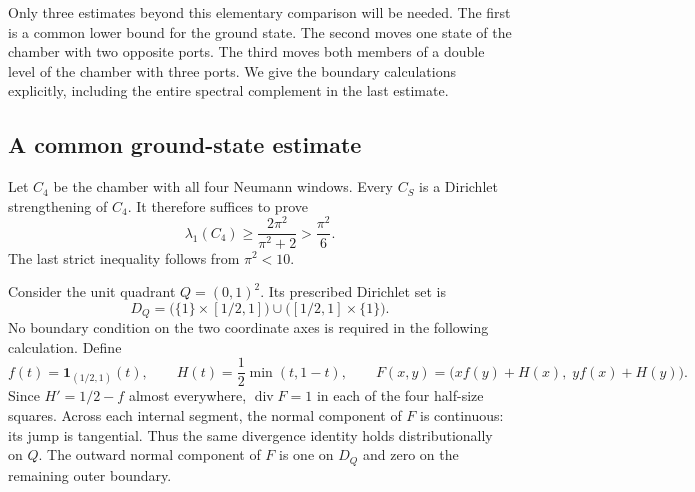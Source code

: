 \documentclass[11pt,reqno]{amsart}
\numberwithin{equation}{section}
\begin{document}
Only three estimates beyond this elementary comparison will be needed.
The first is a common lower bound for the ground state. The second moves
one state of the chamber with two opposite ports. The third moves both
members of a double level of the chamber with three ports. We give the
boundary calculations explicitly, including the entire spectral
complement in the last estimate.

\subsection{A common ground-state estimate}
\label{bd:ground}

Let $C_4$ be the chamber with all four Neumann windows. Every $C_S$ is a
Dirichlet strengthening of $C_4$. It therefore suffices to prove
\begin{equation}
 \lambda_1(C_4)\ge \frac{2\pi^2}{\pi^2+2}>\frac{\pi^2}{6}.
 \label{bd:ground-bound}
\end{equation}
The last strict inequality follows from $\pi^2<10$.

Consider the unit quadrant $Q=(0,1)^2$. Its prescribed Dirichlet set is
\[
 D_Q=\bigl(\{1\}\times[1/2,1]\bigr)
       \cup\bigl([1/2,1]\times\{1\}\bigr).
\]
No boundary condition on the two coordinate axes is required in the
following calculation. Define
\[
 f(t)=\mathbf 1_{(1/2,1)}(t),\qquad
 H(t)=\frac12\min(t,1-t),\qquad
 F(x,y)=\bigl(xf(y)+H(x),\;yf(x)+H(y)\bigr).
\]
Since $H'=1/2-f$ almost everywhere, $\operatorname{div}F=1$ in each
of the four half-size squares. Across each internal segment, the normal
component of $F$ is continuous: its jump is tangential. Thus the same
divergence identity holds distributionally on $Q$. The outward normal
component of $F$ is one on $D_Q$ and zero on the remaining outer boundary.
\end{document}
